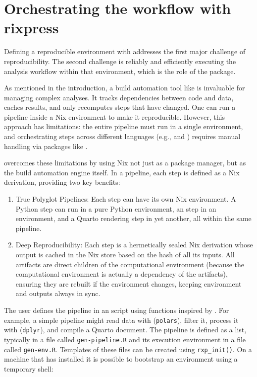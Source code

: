 \documentclass[
  article]{jss}
\providecommand{\tightlist}{%
  \setlength{\itemsep}{0pt}\setlength{\parskip}{0pt}}
\begin{document}
\section{Orchestrating the workflow with rixpress}\label{sec-rixpress}

Defining a reproducible environment with  addresses the first
major challenge of reproducibility. The second challenge is reliably and
efficiently executing the analysis workflow within that environment,
which is the role of the  package.

As mentioned in the introduction, a build automation tool like
 is invaluable for managing complex analyses. It tracks
dependencies between code and data, caches results, and only recomputes
steps that have changed. One can run a  pipeline inside a
Nix environment to make it reproducible. However, this approach has
limitations: the entire pipeline must run in a single environment, and
orchestrating steps across different languages (e.g.,  and
) requires manual handling via packages like
.

 overcomes these limitations by using Nix not just as a
package manager, but as the build automation engine itself. In a
 pipeline, each step is defined as a Nix derivation,
providing two key benefits:

\begin{enumerate}
\def\labelenumi{\arabic{enumi}.}
\tightlist
\item
  True Polyglot Pipelines: Each step can have its own Nix environment. A
  Python step can run in a pure Python environment, an  step
  in an  environment, and a Quarto rendering step in yet
  another, all within the same pipeline.
\item
  Deep Reproducibility: Each step is a hermetically sealed Nix
  derivation whose output is cached in the Nix store based on the hash
  of all its inputs. All artifacts are direct children of the
  computational environment (because the computational environment is
  actually a dependency of the artifacts), ensuring they are rebuilt if
  the environment changes, keeping environment and outputs always in
  sync.
\end{enumerate}

The user defines the pipeline in an  script using functions
inspired by . For example, a simple pipeline might read
data with  (\texttt{polars}), filter it, process it
with  (\texttt{dplyr}), and compile a Quarto document. The
pipeline is defined as a list, typically in a file called
\texttt{gen-pipeline.R} and its execution environment in a file called
\texttt{gen-env.R}. Templates of these files can be created using
\texttt{rxp\_init()}. On a machine that has  installed it is
possible to bootstrap an environment using a temporary shell:
\end{document}
